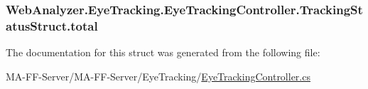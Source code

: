 \subsubsection[{total}]{ Web\+Analyzer.\+Eye\+Tracking.\+Eye\+Tracking\+Controller.\+Tracking\+Status\+Struct.\+total}\label{struct_web_analyzer_1_1_eye_tracking_1_1_eye_tracking_controller_1_1_tracking_status_struct_a0856a70f2933dc67ed4971a443d6a971}


The documentation for this struct was generated from the following file\+:\begin{DoxyCompactItemize}
\item 
M\+A-\/\+F\+F-\/\+Server/\+M\+A-\/\+F\+F-\/\+Server/\+Eye\+Tracking/\hyperlink{_eye_tracking_controller_8cs}{Eye\+Tracking\+Controller.\+cs}\end{DoxyCompactItemize}
